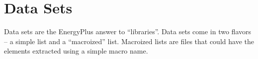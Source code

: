 \chapter{Data Sets}\label{data-sets}

Data sets are the EnergyPlus answer to ``libraries''. Data sets come in two flavors -- a simple list and a ``macroized'' list. Macroized lists are files that could have the elements extracted using a simple macro name.




